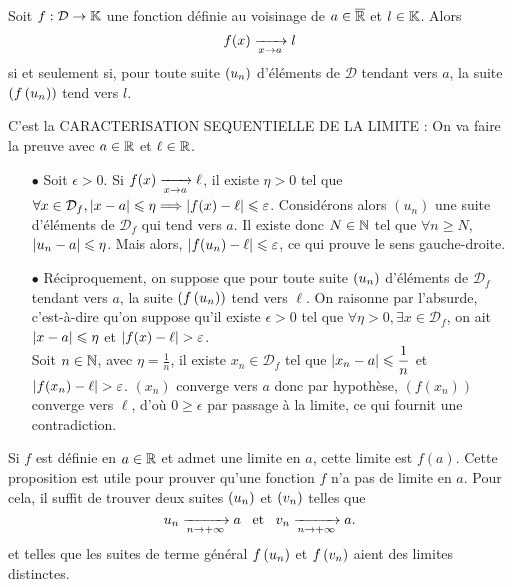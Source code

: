 \documentclass{magnolia}
\begin{document}
\begin{proposition}[utile=-3]
Soit $f:\mathcal{D}\to\mathbb{K}$ une fonction définie au voisinage de $a\in\overline{\mathbb{R}}$ et $l\in\mathbb{K}$.
Alors
\[f(x)\xrightarrow[x\rightarrow a]{} l\]
si et seulement si, pour toute suite $\left(u_n\right)$ d'éléments de $\mathcal{D}$
tendant vers $a$, la suite $\left(f\left(u_n\right)\right)$ tend vers $l$.
\end{proposition}

\begin{preuve}
C'est la CARACTERISATION SEQUENTIELLE DE LA LIMITE :
On va faire la preuve avec $a\in \mathbb{R}$ et $\ell \in \mathbb{R}$.
\begin{itemize}
\item[$\bullet$] Soit $\epsilon >0$. Si $f(x)\xrightarrow[x\rightarrow a]{} \ell$, il existe $\eta>0$ tel que $\forall x \in \mathcal{D}_f, \left|x-a\right|\leqslant \eta \Longrightarrow \left|f(x)-\ell\right|\leqslant \varepsilon$. Considérons alors $(u_n)$ une suite d'éléments de $\mathcal{D}_f$ qui tend vers $a$. Il existe donc $N\in \mathbb{N}$ tel que $\forall n \geq N$, $\left|u_n-a\right|\leqslant \eta$. Mais alors, $\left|f(u_n)-\ell\right|\leqslant \varepsilon$, ce qui prouve le sens gauche-droite.
\item[$\bullet$] Réciproquement, on suppose que pour toute suite $\left(u_n\right)$ d'éléments de $\mathcal{D}_f$
tendant vers $a$, la suite $\left(f\left(u_n\right)\right)$ tend vers $\ell$. On raisonne par l'absurde, c'est-à-dire qu'on suppose qu'il existe $\epsilon>0$ tel que $\forall \eta>0, \exists x \in \mathcal{D}_f$, on ait $\left|x-a\right|\leqslant \eta$ et $\abs{f(x)-\ell}>\epsilon$.\\
Soit $n\in \mathbb{N}$, avec $\eta=\frac{1}{n}$, il existe $x_n\in \mathcal{D}_f$ tel que $\left|x_n-a\right|\leqslant \dfrac{1}{n}$ et $\abs{f(x_n)-\ell}>\epsilon$. $(x_n)$ converge vers $a$ donc par hypothèse, $(f(x_n))$ converge vers $\ell$, d'où $0\geq \epsilon$ par passage à la limite, ce qui fournit une contradiction.
\end{itemize}

\end{preuve}

\begin{remarques}
\remarque Si $f$ est définie en $a\in\mathbb{R}$ et admet une limite en $a$, cette
  limite est $f(a)$.
\exo Cette proposition est utile pour prouver qu'une fonction $f$ n'a pas
  de limite en $a$. Pour cela, il suffit de trouver deux suites
  $\left(u_n\right)$ et $\left(v_n\right)$ telles que
  \[u_n\xrightarrow[n\rightarrow +\infty]{} a \quad\!\text{et}\quad\! v_n\xrightarrow[n\rightarrow +\infty]{} a.\]
  et telles que les suites de terme général $f\left(u_n\right)$ et $f\left(v_n\right)$ aient
  des limites distinctes.
\end{remarques}
\end{document}
